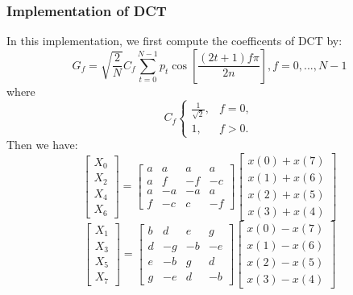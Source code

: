 \subsubsection{Implementation of DCT}
In this implementation, we first compute the coefficents of DCT by:
\[
G_{f} = \sqrt{\frac{2}{N}}C_{f}\sum_{t=0}^{N-1}p_{t}\cos[\frac{(2t+1)f\pi}{2n}],f = 0,...,N\!\!-\!\!1
\]
where \[ C_{f} \left\{ \begin{array}{ll}
\frac{1}{\sqrt{2}}, & f = 0, \\ 1, & f > 0.
\end{array} 
\right.
\]
Then we have:
\[ \left[
\begin{array}{llll}
X_{0} \\ X_{2} \\ X_{4} \\ X_{6}
\end{array}
 \right] = \left[ \begin{array}{cccc}
 a & a & a & a \\ a & f & -f & -c \\ a & -a & -a & a \\ f & -c & c & -f
 \end{array}
 \right] \left[ \begin{array}{llll}
 x(0)+x(7) \\ x(1)+x(6) \\ x(2)+x(5) \\ x(3)+x(4)
 \end{array}
 \right]
\] 
\[ \left[
\begin{array}{llll}
X_{1} \\ X_{3} \\ X_{5} \\ X_{7}
\end{array}
 \right] = \left[ \begin{array}{cccc}
 b & d & e & g \\ d & -g & -b & -e \\ e & -b & g & d \\ g & -e & d & -b
 \end{array}
 \right] \left[ \begin{array}{llll}
 x(0)-x(7) \\ x(1)-x(6) \\ x(2)-x(5) \\ x(3)-x(4)
 \end{array}
 \right]
\] 
